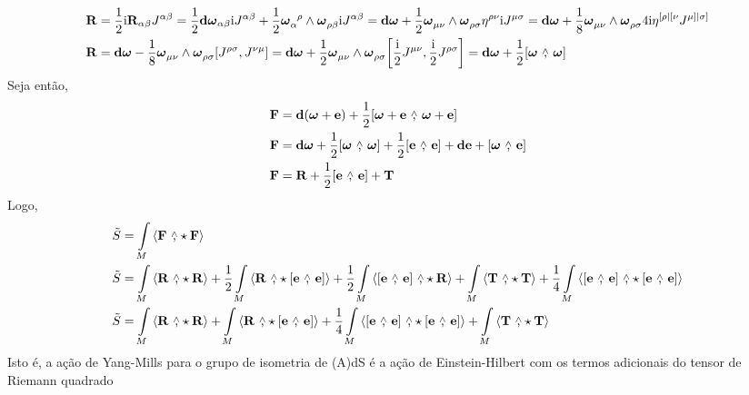 \begin{align*}
    \vb R&=\frac12\im\vb R_{\alpha\beta}J^{\alpha\beta}=\frac12\vb d\boldsymbol\omega_{\alpha\beta}\im J^{\alpha\beta}+\frac12\tensor{{\boldsymbol\omega}}{_\alpha^\rho}\wedge\tensor{{\boldsymbol\omega}}{_\rho_\beta}\im J^{\alpha\beta}=\vb d\boldsymbol\omega+\frac12\tensor{{\boldsymbol\omega}}{_\mu_\nu}\wedge\tensor{{\boldsymbol\omega}}{_\rho_\sigma}\eta^{\rho\nu}\im J^{\mu\sigma}=\vb d\boldsymbol\omega+\frac18\tensor{{\boldsymbol\omega}}{_\mu_\nu}\wedge\tensor{{\boldsymbol\omega}}{_\rho_\sigma}4\im \eta^{[\rho|[\nu}J^{\mu]|\sigma]}\\
    \vb R&=\vb d\boldsymbol\omega-\frac18\tensor{{\boldsymbol\omega}}{_\mu_\nu}\wedge\tensor{{\boldsymbol\omega}}{_\rho_\sigma}\comm{J^{\rho\sigma}}{J^{\nu\mu}}=\vb d\boldsymbol\omega+\frac12\tensor{{\boldsymbol\omega}}{_\mu_\nu}\wedge\tensor{{\boldsymbol\omega}}{_\rho_\sigma}\comm{\frac\im 2J^{\mu\nu}}{\frac\im2J^{\rho\sigma}}=\vb d\boldsymbol\omega+\frac12\wedgecomm{\boldsymbol\omega}{\boldsymbol\omega}
\end{align*}
Seja então,
\begin{align*}
    \vb F&=\vb d\qty(\boldsymbol \omega+\vb e)+\frac12\wedgecomm{\boldsymbol \omega+\vb e}{\boldsymbol \omega+\vb e}\\
    \vb F&=\vb d\boldsymbol \omega+\frac12\wedgecomm{\boldsymbol \omega}{\boldsymbol \omega}+\frac12\wedgecomm{\vb e}{\vb e}+\vb d\vb e+\wedgecomm{\boldsymbol \omega}{\vb e}\\
    \vb F&=\vb R+\frac12\wedgecomm{\vb e}{\vb e}+\vb T
\end{align*}
Logo, 
\begin{align*}
    \tilde S&=\int\limits_{M}\expval{\vb F\ \wedgecomma \star \vb F}\\
    \tilde S&=\int\limits_{M}\expval{\vb R\ \wedgecomma \star \vb R}+\frac12\int\limits_{M}\expval{\vb R\ \wedgecomma \star \wedgecomm{\vb e}{\vb e}}+\frac12\int\limits_{M}\expval{ \wedgecomm{\vb e}{\vb e}\ \wedgecomma \star\vb R}+\int\limits_{M}\expval{\vb T\ \wedgecomma \star \vb T}+\frac14\int\limits_{M}\expval{\wedgecomm{\vb e}{\vb e}\ \wedgecomma \star \wedgecomm{\vb e}{\vb e}}\\
    \tilde S&=\int\limits_{M}\expval{\vb R\ \wedgecomma \star \vb R}+\int\limits_{M}\expval{\vb R\ \wedgecomma \star \wedgecomm{\vb e}{\vb e}}+\frac14\int\limits_{M}\expval{\wedgecomm{\vb e}{\vb e}\ \wedgecomma \star \wedgecomm{\vb e}{\vb e}}+\int\limits_{M}\expval{\vb T\ \wedgecomma \star \vb T}
\end{align*}
Isto é, a ação de Yang-Mills para o grupo de isometria de (A)dS é a ação de Einstein-Hilbert com os termos adicionais do tensor de Riemann quadrado 
